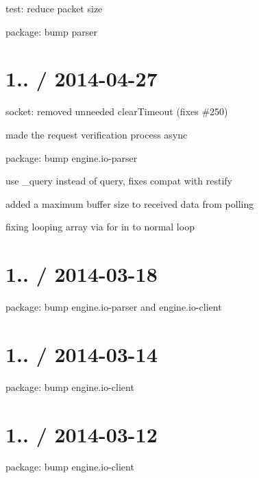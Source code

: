 \begin{DoxyItemize}
\item test\+: reduce packet size
\item package\+: bump parser
\end{DoxyItemize}

\section*{1.. / 2014-\/04-\/27 }


\begin{DoxyItemize}
\item socket\+: removed unneeded {\ttfamily clear\+Timeout} (fixes \#250)
\item made the request verification process async
\item package\+: bump {\ttfamily engine.\+io-\/parser}
\item use \+\_\+query instead of query, fixes compat with restify
\item added a maximum buffer size to received data from polling
\item fixing looping array via for in to normal loop
\end{DoxyItemize}

\section*{1.. / 2014-\/03-\/18 }


\begin{DoxyItemize}
\item package\+: bump {\ttfamily engine.\+io-\/parser} and {\ttfamily engine.\+io-\/client}
\end{DoxyItemize}

\section*{1.. / 2014-\/03-\/14 }


\begin{DoxyItemize}
\item package\+: bump {\ttfamily engine.\+io-\/client}
\end{DoxyItemize}

\section*{1.. / 2014-\/03-\/12 }


\begin{DoxyItemize}
\item package\+: bump {\ttfamily engine.\+io-\/client}
\end{DoxyItemize}

